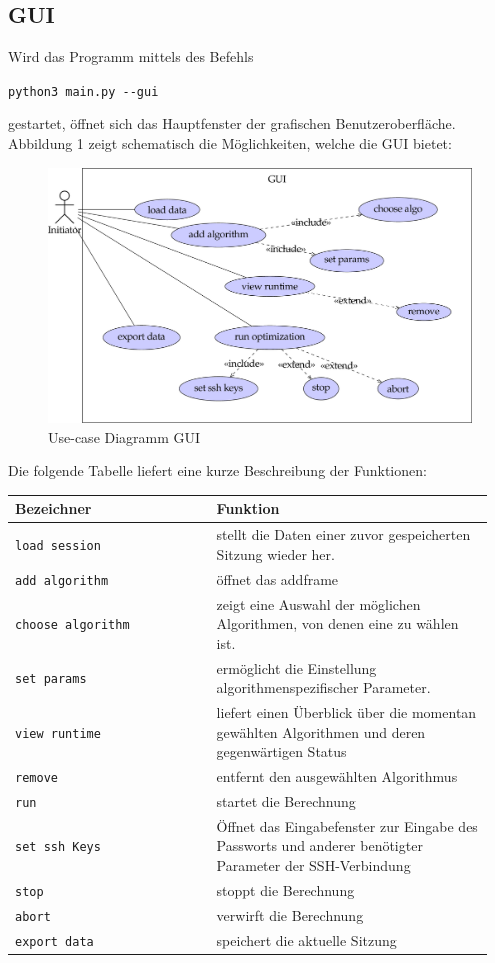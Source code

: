 \documentclass[
  a4paper,               %
  twoside,               %
  DIV=12,                %
  BCOR=8mm,              %
  headinclude=true,      %
  footinclude=false,     %
  numbers=noenddot,      %
  headheight=40pt,       %
  11pt]{scrartcl}        %
\begin{document}
\subsection{GUI}
Wird das Programm mittels des Befehls
\begin{center}
\texttt{python3 main.py -{}-gui}
\end{center}
gestartet, öffnet sich das Hauptfenster der grafischen Benutzeroberfläche.
Abbildung 1 zeigt schematisch die Möglichkeiten, welche die GUI bietet:\\
\begin{figure}[h]
\includegraphics[scale = 2.5]{../presentation/GUI-use-case.png}
\caption{Use-case Diagramm GUI}
\end{figure}
\newpage
\begin{samepage}
Die folgende Tabelle liefert eine kurze Beschreibung der Funktionen:\\[0.5cm]
\begin{tabular}{p{0.4\linewidth}|p{0.55\linewidth}}
	\toprule
	Bezeichner & Funktion\tabularnewline
	\midrule
	\texttt{load session} & stellt die Daten einer zuvor gespeicherten Sitzung wieder her.\tabularnewline
	\texttt{add\ algorithm} & öffnet das addframe\tabularnewline
	\texttt{choose\ algorithm} & zeigt eine Auswahl der möglichen Algorithmen, von denen eine zu wählen ist.\tabularnewline
	\texttt{set\ params} & ermöglicht die Einstellung algorithmenspezifischer Parameter.\tabularnewline
	\texttt{view\ runtime} & liefert einen Überblick über die momentan gewählten Algorithmen und deren gegenwärtigen Status\tabularnewline
	\texttt{remove} & entfernt den ausgewählten Algorithmus\tabularnewline
	\texttt{run} & startet die Berechnung\tabularnewline
	\texttt{set\ ssh\ Keys} & Öffnet das Eingabefenster zur Eingabe des
	Passworts und anderer benötigter Parameter der SSH-Verbindung\tabularnewline
	\texttt{stop} & stoppt die Berechnung\tabularnewline
	\texttt{abort} & verwirft die Berechnung\tabularnewline
	\texttt{export data} & speichert die aktuelle Sitzung\tabularnewline
	\bottomrule
\end{tabular}\\
\end{samepage}
\end{document}
